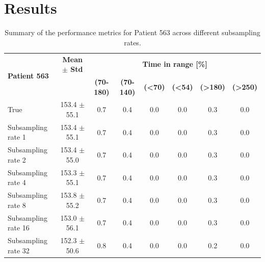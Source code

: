 
\section{Results}
\begin{table}[ht]
	\centering
	\begin{tabular}{|l|c|c|c|c|c|c|c|}
		\hline
		\multirow{2}{*}{\textbf{Patient 563}} & \multicolumn{1}{c|}{\textbf{Mean $\pm$ Std}} & \multicolumn{6}{c|}{\textbf{Time in range [\%]}} \\ \cline{3-8}
		&  & \textbf{(70-180)} & \textbf{(70-140)} & \textbf{(<70)} & \textbf{(<54)} & \textbf{(>180)} & \textbf{(>250)} \\ \hline
		True                 & 153.4 $\pm$ 55.1    & 0.7    & 0.4    & 0.0    & 0.0    & 0.3    & 0.0    \\ \hline
		Subsampling rate 1   & 153.4 $\pm$ 55.1    & 0.7    & 0.4    & 0.0    & 0.0    & 0.3    & 0.0    \\ \hline
		Subsampling rate 2   & 153.4 $\pm$ 55.0    & 0.7    & 0.4    & 0.0    & 0.0    & 0.3    & 0.0    \\ \hline
		Subsampling rate 4   & 153.3 $\pm$ 55.1    & 0.7    & 0.4    & 0.0    & 0.0    & 0.3    & 0.0    \\ \hline
		Subsampling rate 8   & 153.8 $\pm$ 55.2    & 0.7    & 0.4    & 0.0    & 0.0    & 0.3    & 0.0    \\ \hline
		Subsampling rate 16  & 153.0 $\pm$ 56.1    & 0.7    & 0.4    & 0.0    & 0.0    & 0.3    & 0.0    \\ \hline
		Subsampling rate 32  & 152.3 $\pm$ 50.6    & 0.8    & 0.4    & 0.0    & 0.0    & 0.2    & 0.0    \\ \hline
	\end{tabular}
	\caption{Summary of the performance metrics for Patient 563 across different subsampling rates.}
	\label{tab:patient563}
\end{table}


